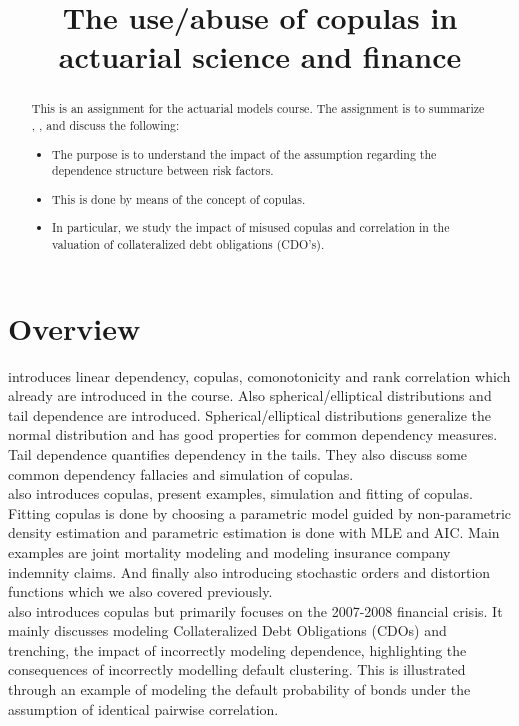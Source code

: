 \documentclass[a4paper,12pt]{article}
\title{The use/abuse of copulas in actuarial science and finance}
\date{}
\begin{document}
\maketitle

\begin{abstract}
    This is an assignment for the actuarial models course.
    The assignment is to summarize \cite{dempster_correlation_2002}, \cite{frees_understanding_1998},
    \cite{donnelly_devil_nodate} and discuss the following:

    \begin{itemize}
        \item  The purpose is to understand the impact of the assumption regarding
              the dependence structure between risk factors.
        \item  This is done by means of the concept of copulas.
        \item  In particular, we study the impact of misused copulas and correlation in the
              valuation of collateralized debt obligations (CDO's).
    \end{itemize}

\end{abstract}

\section{Overview}
\cite{dempster_correlation_2002} introduces linear dependency, copulas, comonotonicity and rank correlation which
already are introduced in the course. Also spherical/elliptical distributions and tail dependence are introduced.
Spherical/elliptical distributions generalize the normal distribution and has good properties for common dependency
measures.  Tail dependence quantifies dependency in the tails. They also discuss some
common dependency fallacies and simulation of copulas.\\

\cite{frees_understanding_1998} also introduces copulas, present examples, simulation
and fitting of copulas. Fitting copulas is done by choosing a parametric model
guided by non-parametric density estimation and parametric estimation is done
with MLE and AIC.
Main examples are joint mortality modeling and modeling insurance company indemnity claims.
And finally also introducing stochastic orders and distortion functions which we also covered previously. \\

\cite{donnelly_devil_nodate} also introduces copulas but primarily focuses on the 2007-2008 financial crisis.
It mainly discusses modeling Collateralized Debt Obligations (CDOs) and trenching, the impact of
incorrectly modeling dependence, highlighting the consequences of incorrectly modelling default clustering.
This is illustrated through an example of modeling the default probability of bonds under the assumption
of identical pairwise correlation. \\
\end{document}
